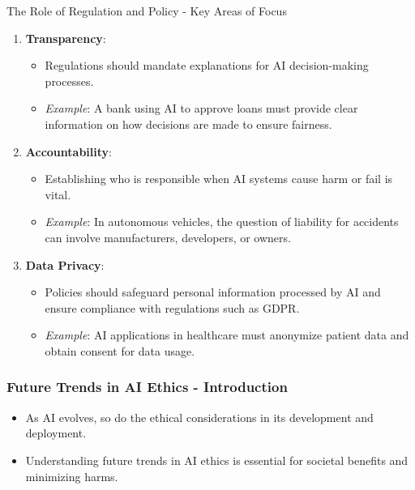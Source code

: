 \documentclass[aspectratio=169]{beamer}
\begin{document}
\begin{frame}[fragile]{The Role of Regulation and Policy - Key Areas of Focus}
    \begin{enumerate}
        \item \textbf{Transparency}:
        \begin{itemize}
            \item Regulations should mandate explanations for AI decision-making processes.
            \item \textit{Example}: A bank using AI to approve loans must provide clear information on how decisions are made to ensure fairness.
        \end{itemize}
        
        \item \textbf{Accountability}:
        \begin{itemize}
            \item Establishing who is responsible when AI systems cause harm or fail is vital.
            \item \textit{Example}: In autonomous vehicles, the question of liability for accidents can involve manufacturers, developers, or owners.
        \end{itemize}
        
        \item \textbf{Data Privacy}:
        \begin{itemize}
            \item Policies should safeguard personal information processed by AI and ensure compliance with regulations such as GDPR.
            \item \textit{Example}: AI applications in healthcare must anonymize patient data and obtain consent for data usage.
        \end{itemize}
    \end{enumerate}
\end{frame}

\begin{frame}[fragile]
    \frametitle{Future Trends in AI Ethics - Introduction}
    \begin{itemize}
        \item As AI evolves, so do the ethical considerations in its development and deployment.
        \item Understanding future trends in AI ethics is essential for societal benefits and minimizing harms.
    \end{itemize}
\end{frame}
\end{document}
